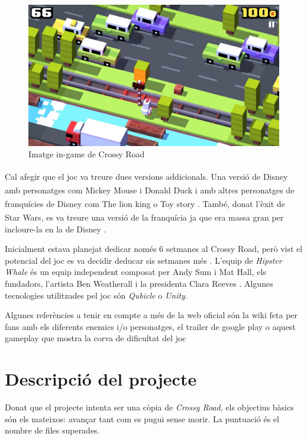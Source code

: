 \documentclass{article}
\begin{document}
\begin{figure}
	\includegraphics[width=\linewidth]{CrossyRoadGameplay.jpg}
	\caption{Imatge in-game de Crossy Road}
	\label{inGame}
\end{figure}

Cal afegir que el joc va treure dues versions addicionals. Una versió de 
Disney\textsuperscript{\textregistered} amb personatges com Mickey Mouse\textsuperscript{\texttrademark} i 
Donald Duck\textsuperscript{\texttrademark} i amb altres personatges
de franquícies de Disney com The lion king\textsuperscript{\texttrademark}
o Toy story\textsuperscript{\texttrademark} \cite{disneyCrossy}. També,
donat l'èxit de Star Wars\textsuperscript{\texttrademark}, es va treure
una versió de la franquícia ja que era massa gran per incloure-la en
la de Disney \cite{starWarsCrossy}. \newline

Inicialment estava planejat dedicar només 6 setmanes al Crossy Road, però vist el 
potencial del joc es va decidir deducar sis setmanes més \cite{delayedCrossy}. L'equip
de \textit{Hipster Whale} és un equip independent composat per Andy Sum i Mat Hall, els
fundadors, l'artista Ben Weatherall i la presidenta Clara Reeves \cite{HipsterPressKit}.
Algunes tecnologies utilitzades pel joc són \textit{Qubicle} \cite{qubicle} \cite{crossyPressKit} o \textit{Unity}.

Algunes referències a tenir en compte a més de la web oficial \cite{webCrossy} són la wiki feta per
fans \cite{crossyWiki} amb els diferents enemics i/o personatges, el trailer
de google play \cite{trailerCrossy} o aquest gameplay que mostra la corva de dificultat
del joc \cite{gameplayCrossy}

\section{Descripció del projecte}
Donat que el projecte intenta ser una còpia de \textit{Crossy Road}, els 
objectius bàsics són els mateixos: avançar tant com es pugui sense morir.
La puntuació és el nombre de files superades.
\end{document}
